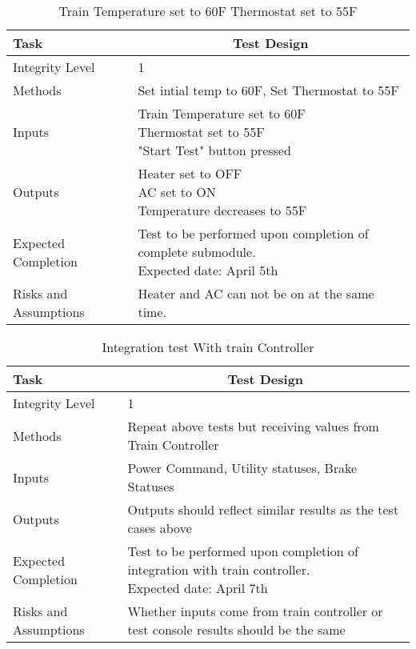 \documentclass[]{article}
\begin{document}
	\begin{table}[H]
		\centering
		\caption{Train Temperature set to 60F Thermostat set to 55F}
		\begin{tabular}{|l|l|}
			\hline
			Task & \multicolumn{1}{c|}{Test Design} \\ \hline
			Integrity Level & 1 \\ \hline
			Methods & Set intial temp to 60F, Set Thermostat to 55F  \\ \hline
			Inputs &  \parbox[t]{10cm}{Train Temperature set to 60F\\ Thermostat set to 55F\\ "Start Test" button pressed }\\ \hline
			Outputs &\parbox[t]{10cm}{ Heater set to OFF\\AC set to ON\\ Temperature decreases to 55F} \\ \hline
			Expected Completion & \parbox[t]{10cm}{Test to be performed upon completion of complete submodule.\\ Expected date: April 5th}\\ \hline
			Risks and Assumptions & Heater and AC can not be on at the same time.\\ \hline
		\end{tabular}
	\end{table}

	\begin{table}[H]
		\centering
		\caption{Integration test With train Controller}
		\begin{tabular}{|l|l|}
			\hline
			Task & \multicolumn{1}{c|}{Test Design} \\ \hline
			Integrity Level & 1 \\ \hline
			Methods & Repeat above tests but receiving values from Train Controller \\ \hline
			Inputs &  Power Command, Utility statuses, Brake Statuses\\ \hline
			Outputs & Outputs should reflect similar results as the test cases above \\ \hline
			Expected Completion & \parbox[t]{10cm}{Test to be performed upon completion of integration with train controller.\\ Expected date: April 7th}\\ \hline
			Risks and Assumptions & \parbox[t]{10cm}{Whether inputs come from train controller or test console results should be the same}\\ \hline
		\end{tabular}
	\end{table}
\end{document}
